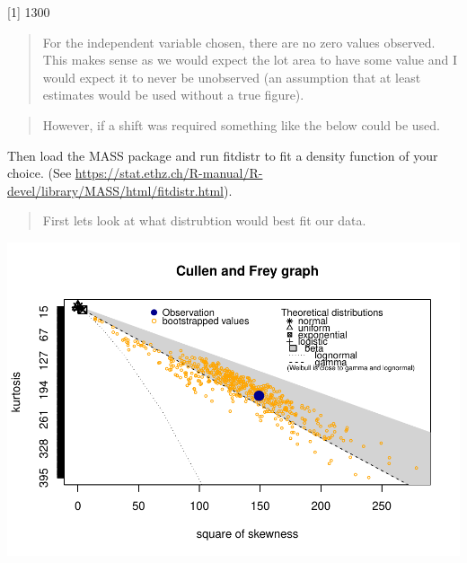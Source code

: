 \documentclass[]{article}
\newenvironment{Shaded}{\begin{snugshade}}{\end{snugshade}}
\newcommand{\KeywordTok}[1]{\textcolor[rgb]{0.13,0.29,0.53}{\textbf{{#1}}}}
\newcommand{\DataTypeTok}[1]{\textcolor[rgb]{0.13,0.29,0.53}{{#1}}}
\newcommand{\DecValTok}[1]{\textcolor[rgb]{0.00,0.00,0.81}{{#1}}}
\newcommand{\StringTok}[1]{\textcolor[rgb]{0.31,0.60,0.02}{{#1}}}
\newcommand{\OtherTok}[1]{\textcolor[rgb]{0.56,0.35,0.01}{{#1}}}
\newcommand{\NormalTok}[1]{{#1}}
\begin{document}
{[}1{]} 1300

\begin{quote}
For the independent variable chosen, there are no zero values observed.
This makes sense as we would expect the lot area to have some value and
I would expect it to never be unobserved (an assumption that at least
estimates would be used without a true figure).
\end{quote}

\begin{quote}
However, if a shift was required something like the below could be used.
\end{quote}

\begin{Shaded}
\end{Shaded}

Then load the MASS package and run fitdistr to fit a density function of
your choice. (See
\url{https://stat.ethz.ch/R-manual/R-devel/library/MASS/html/fitdistr.html}).

\begin{quote}
First lets look at what distrubtion would best fit our data.
\end{quote}

\begin{Shaded}
\end{Shaded}

\includegraphics{Final_Project_files/figure-latex/unnamed-chunk-14-1.pdf}
\end{document}
